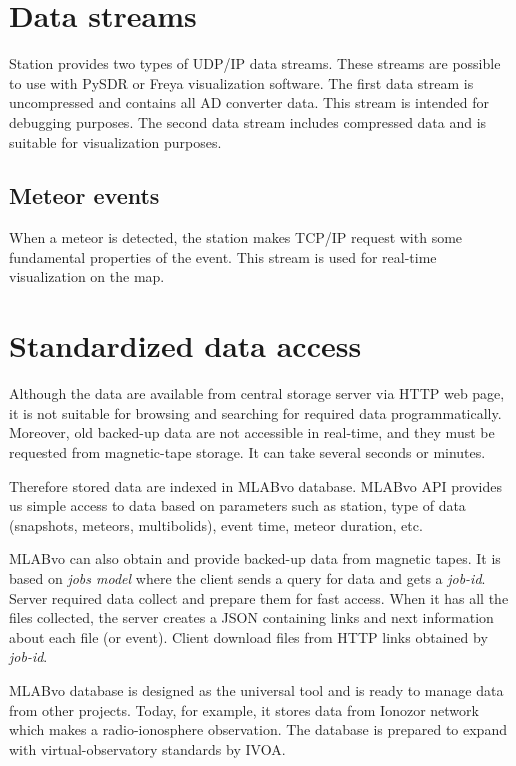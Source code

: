 \documentclass[10pt,a4paper,twoside,dvips]{article}
\begin{document}
\begin{IMCpaper}
\section{Data streams}
Station provides two types of UDP/IP data streams. These streams are possible to use with PySDR or Freya visualization software. The first data stream is uncompressed and contains all AD converter data. This stream is intended for debugging purposes. The second data stream includes compressed data and is suitable for visualization purposes.                                              

\subsection{Meteor events}
When a meteor is detected, the station makes TCP/IP request with some fundamental properties of the event. This stream is used for real-time visualization on the map.                                                                                        

\section{Standardized data access}
Although the data are available from central storage server via HTTP web page, it is not suitable for browsing and searching for required data programmatically. Moreover, old backed-up data are not accessible in real-time, and they must be requested from magnetic-tape storage. It can take several seconds or minutes.

Therefore stored data are indexed in MLABvo database. MLABvo API provides us simple access to data based on parameters such as station, type of data (snapshots, meteors, multibolids), event time, meteor duration, etc.                   

MLABvo can also obtain and provide backed-up data from magnetic tapes. It is based on \textit{jobs model} where the client sends a query for data and gets a \textit{job-id}. Server required data collect and prepare them for fast access. When it has all the files collected, the server creates a JSON containing links and next information about each file (or event). Client download files from HTTP links obtained by \textit{job-id}.

MLABvo database is designed as the universal tool and is ready to manage data from other projects. Today, for example, it stores data from Ionozor network which makes a radio-ionosphere observation. The database is prepared to expand with virtual-observatory standards by IVOA. 


\end{IMCpaper}
\end{document}
